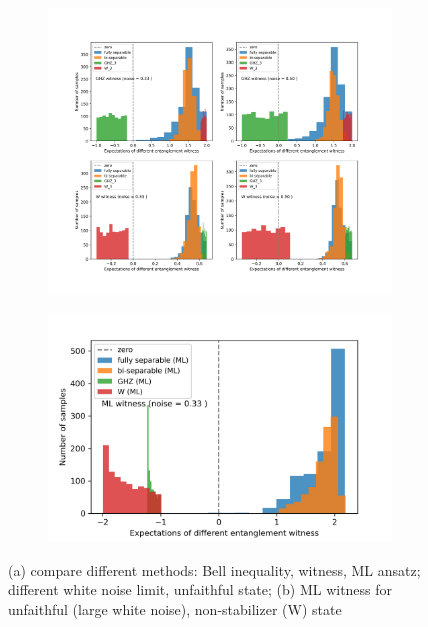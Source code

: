 \documentclass[
aps,
pra,
floatfix,
]{revtex4-2}
\theoremstyle{plain}
\theoremstyle{definition}
\begin{document}
\begin{figure}[!ht]
	\centering
	\begin{subfigure}{0.45\textwidth}
	\centering
		\includegraphics[width=.98\linewidth]{./Code/fidelity_witness_compare.png}
	\end{subfigure}
	\begin{subfigure}{0.52\textwidth}
	\centering
		\includegraphics[width=.95\linewidth]{./Code/three_qubit_hist_.png}
	\end{subfigure}
	\caption{(a) compare different methods: Bell inequality, witness, ML ansatz; different white noise limit, unfaithful state; (b) ML witness for unfaithful (large white noise), non-stabilizer (W) state}
\end{figure}
\end{document}
